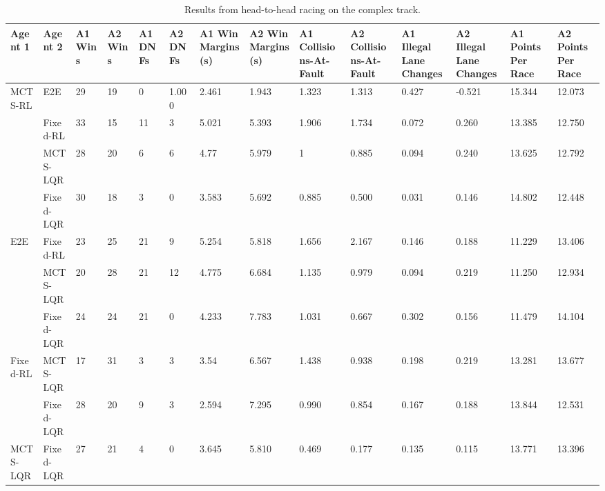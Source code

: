 \begin{table}[H]
\centering
\begin{adjustbox}{width=\textwidth}
\begin{tabular}{llp{1.1cm}p{1.1cm}p{1.1cm}p{1.1cm}p{1.5cm}p{1.5cm}p{1.5cm}p{1.5cm}p{1.5cm}p{1.5cm}p{1.1cm}p{1.1cm}}
\toprule
        Agent 1 & Agent 2 & A1 Wins & A2 Wins & A1 DNFs & A2 DNFs & A1 Win Margins (\si{\second}) & A2 Win Margins (\si{\second}) & A1 Collisions-At-Fault & A2 Collisions-At-Fault & A1 Illegal Lane Changes & A2 Illegal Lane Changes & A1 Points Per Race & A2 Points Per Race \\ \bottomrule
        MCTS-RL & E2E & 29 & 19 & 0 & 1.000 & 2.461 & 1.943 & 1.323 & 1.313 & 0.427 & -0.521 & 15.344 & 12.073 \\ 
        ~ & Fixed-RL & 33 & 15 & 11 & 3 & 5.021 & 5.393 & 1.906 & 1.734 & 0.072 & 0.260 & 13.385 & 12.750 \\ 
        ~ & MCTS-LQR & 28 & 20 & 6 & 6 & 4.77 & 5.979 & 1 & 0.885 & 0.094 & 0.240 & 13.625 & 12.792 \\
        ~ & Fixed-LQR & 30 & 18 & 3 & 0 & 3.583 & 5.692 & 0.885 & 0.500 & 0.031 & 0.146 & 14.802 & 12.448 \\ \hline
        E2E & Fixed-RL & 23 & 25 & 21 & 9 & 5.254 & 5.818 & 1.656 & 2.167 & 0.146 & 0.188 & 11.229 & 13.406 \\ 
        ~ & MCTS-LQR & 20 & 28 & 21 & 12 & 4.775 & 6.684 & 1.135 & 0.979 & 0.094 & 0.219 & 11.250 & 12.934 \\
        ~ & Fixed-LQR & 24 & 24 & 21 & 0 & 4.233 & 7.783 & 1.031 & 0.667 & 0.302 & 0.156 & 11.479 & 14.104 \\ \hline
        Fixed-RL & MCTS-LQR & 17 & 31 & 3 & 3 & 3.54 & 6.567 & 1.438 & 0.938 & 0.198 & 0.219 & 13.281 & 13.677 \\ 
        ~ & Fixed-LQR & 28 & 20 & 9 & 3 & 2.594 & 7.295 & 0.990 & 0.854 & 0.167 & 0.188 & 13.844 & 12.531 \\ \hline
        MCTS-LQR & Fixed-LQR & 27 & 21 & 4 & 0 & 3.645 & 5.810 & 0.469 & 0.177 & 0.135 & 0.115 & 13.771 & 13.396 \\ \bottomrule
\end{tabular}
\end{adjustbox}
\vspace{1 mm}
\caption{Results from head-to-head racing on the complex track.}
 \label{tab:team_results_complex}
\end{table}